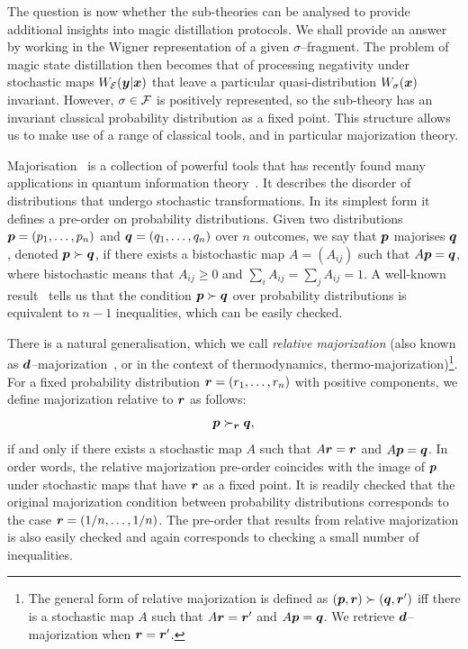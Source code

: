 \documentclass[pra,
aps,
twocolumn,
superscriptaddress,
groupedaddress,
nofootinbib,
reprint
]{revtex4-1}
\begin{document}
The question is now whether the sub-theories can be analysed to provide additional insights into magic distillation protocols. We shall provide an answer by working in the Wigner representation of a given $\sigma$--fragment. The problem of magic state distillation then becomes that of processing negativity under stochastic maps $W_{\mathcal{E}}( \boldsymbol{y} |\boldsymbol{x})$ that leave a particular quasi-distribution $W_\sigma(\boldsymbol{x})$ invariant. However, $\sigma \in \mathcal{F}$ is positively represented, so the sub-theory has an invariant classical probability distribution as a fixed point. This structure allows us to make use of a range of classical tools, and in particular majorization theory.

Majorisation~\cite{cit:marshall} is a collection of powerful tools that has recently found many applications in quantum information theory~\cite{Nielsen_1999, cit:cwiklinski, cit:lostaglio2, cit:gour, cit:gour2, Horodecki_2003, Vallejos_2021}.
It describes the disorder of distributions that undergo stochastic transformations. In its simplest form it defines a pre-order on probability distributions. Given two distributions $\boldsymbol{p}= (p_1, \dots, p_n)$ and $\boldsymbol{q} = (q_1, \dots, q_n)$ over $n$ outcomes, we say that $\boldsymbol{p}$ majorises $\boldsymbol{q}$, denoted $\boldsymbol{p} \succ \boldsymbol{q}$, if there exists a bistochastic map $A = (A_{ij})$ such that $A\boldsymbol{p} = \boldsymbol{q}$, where bistochastic means that $A_{ij} \geq 0$ and $\sum_i A_{ij} = \sum_j A_{ij} = 1$. A well-known result~\cite{cit:marshall} tells us that the condition $ \boldsymbol{p} \succ \boldsymbol{q}$ over probability distributions is equivalent to $n-1$ inequalities, which can be easily checked.

There is a natural generalisation, which we call \emph{relative majorization} (also known as $\bm{d}$--majorization~\cite{Veinott_1971}, or in the context of thermodynamics, thermo-majorization)\footnote{The general form of relative majorization is defined as $(\boldsymbol{p},\boldsymbol{r}) \succ (\boldsymbol{q}, \boldsymbol{r}')$ iff there is a stochastic map $A$ such that $A\boldsymbol{r} = \boldsymbol{r}'$ and $A\boldsymbol{p} = \boldsymbol{q}$. We retrieve $\bm{d}$--majorization when $\boldsymbol{r} = \boldsymbol{r}'$.}. For a fixed probability distribution $\boldsymbol{r} = (r_1, \dots, r_n)$ with positive components, we define majorization relative to $\boldsymbol{r}$ as follows:
\begin{equation}
\boldsymbol{p} \succ_{\boldsymbol{r}} \boldsymbol{q},
\end{equation}
if and only if there exists a stochastic map $A$ such that $A\boldsymbol{r} = \boldsymbol{r}$ and $A \boldsymbol{p} = \boldsymbol{q}$. In order words, the relative majorization pre-order coincides with the image of $\boldsymbol{p}$ under stochastic maps that have $\boldsymbol{r}$ as a fixed point. It is readily checked that the original majorization condition between probability distributions corresponds to the case $\boldsymbol{r} = (1/n, \dots, 1/n)$. The pre-order that results from relative majorization is also easily checked and again corresponds to checking a small number of inequalities.
\end{document}
